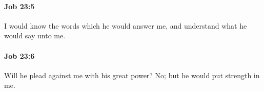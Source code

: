 		\paragraph{Job 23:5} %
			\label{JOB-23-5}

			I would know the words which he would answer me, and understand what he would say unto me.


		\paragraph{Job 23:6} %
			\label{JOB-23-6}

			Will he plead against me with his great power? No; but he would put strength in me.


